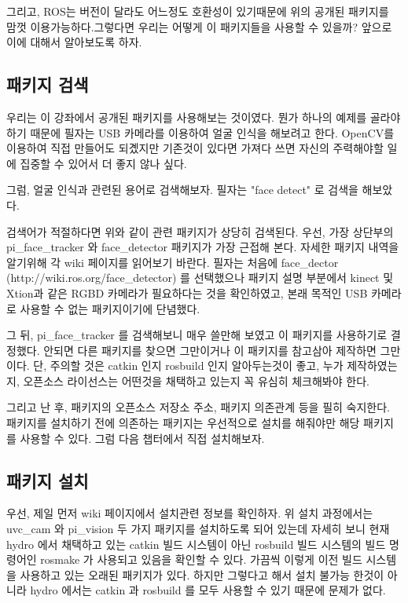 그리고, ROS는 버전이 달라도 어느정도 호환성이 있기때문에 위의 공개된 패키지를 맘껏 이용가능하다.그렇다면 우리는 어떻게 이 패키지들을 사용할 수 있을까? 앞으로 이에 대해서 알아보도록 하자.

\subsection{패키지 검색}

우리는 이 강좌에서 공개된 패키지를 사용해보는 것이였다. 뭔가 하나의 예제를 골라야하기 때문에 필자는 USB 카메라를 이용하여 얼굴 인식을 해보려고 한다. OpenCV를 이용하여 직접 만들어도 되곘지만 기존것이 있다면 가져다 쓰면 자신의 주력해야할 일에 집중할 수 있어서 더 좋지 않나 싶다.

그럼, 얼굴 인식과 관련된 용어로 검색해보자. 필자는 "face detect" 로 검색을 해보았다.

검색어가 적절하다면 위와 같이 관련 패키지가 상당히 검색된다.  우선, 가장 상단부의 pi\_face\_tracker 와 face\_detector 패키지가 가장 근접해 본다. 자세한 패키지 내역을 알기위해 각 wiki 페이지를 읽어보기 바란다. 필자는 처음에 face\_dector (http://wiki.ros.org/face\_detector) 를 선택했으나 패키지 설명 부분에서 kinect 및 Xtion과 같은 RGBD 카메라가 필요하다는 것을 확인하였고, 본래 목적인 USB 카메라로 사용할 수 없는 패키지이기에 단념했다.

그 뒤, pi\_face\_tracker 를 검색해보니 매우 쓸만해 보였고 이 패키지를 사용하기로 결정했다. 안되면 다른 패키지를 찾으면 그만이거나 이 패키지를 참고삼아 제작하면 그만이다. 단, 주의할 것은 catkin 인지 rosbuild 인지 알아두는것이 좋고, 누가 제작하였는지, 오픈소스 라이선스는 어떤것을 채택하고 있는지 꼭 유심히 체크해봐야 한다.

그리고 난 후, 패키지의 오픈소스 저장소 주소, 패키지 의존관계 등을 필히 숙지한다. 패키지를 설치하기 전에 의존하는 패키지는 우선적으로 설치를 해줘야만 해당 패키지를 사용할 수 있다. 그럼 다음 챕터에서 직접 설치해보자.

\subsection{패키지 설치}

우선, 제일 먼저 wiki 페이지에서 설치관련 정보를 확인하자. 위 설치 과정에서는 uvc\_cam 와 pi\_vision 두 가지 패키지를 설치하도록 되어 있는데 자세히 보니 현재 hydro 에서 채택하고 있는 catkin 빌드 시스템이 아닌 rosbuild 빌드 시스템의 빌드 명령어인 rosmake 가 사용되고 있음을 확인할 수 있다. 가끔씩 이렇게 이전 빌드 시스템을 사용하고 있는 오래된 패키지가 있다. 하지만 그렇다고 해서 설치 불가능 한것이 아니라 hydro 에서는 catkin 과 rosbuild 를 모두 사용할 수 있기 때문에 문제가 없다.

